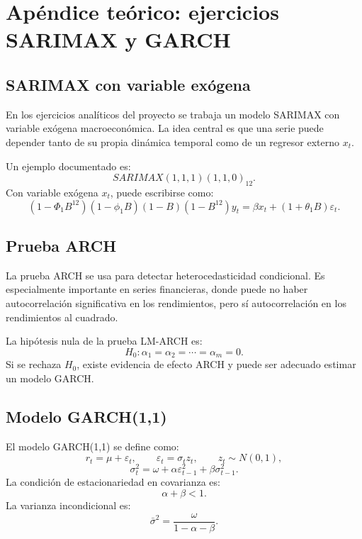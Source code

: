 \documentclass[11pt,letterpaper]{article}
\begin{document}
\section{Apéndice teórico: ejercicios SARIMAX y GARCH}

\subsection{SARIMAX con variable exógena}

\begin{markdowncell}
En los ejercicios analíticos del proyecto se trabaja un modelo SARIMAX con variable exógena macroeconómica. La idea central es que una serie puede depender tanto de su propia dinámica temporal como de un regresor externo \(x_t\).
\end{markdowncell}

\begin{latexcell}
Un ejemplo documentado es:
\[
SARIMAX(1,1,1)(1,1,0)_{12}.
\]
Con variable exógena \(x_t\), puede escribirse como:
\[
(1-\Phi_1B^{12})(1-\phi_1B)(1-B)(1-B^{12})y_t
= \beta x_t + (1+\theta_1B)\varepsilon_t.
\]
\end{latexcell}

\subsection{Prueba ARCH}

\begin{markdowncell}
La prueba ARCH se usa para detectar heterocedasticidad condicional. Es especialmente importante en series financieras, donde puede no haber autocorrelación significativa en los rendimientos, pero sí autocorrelación en los rendimientos al cuadrado.
\end{markdowncell}

\begin{latexcell}
La hipótesis nula de la prueba LM-ARCH es:
\[
H_0:\alpha_1=\alpha_2=\cdots=\alpha_m=0.
\]
Si se rechaza \(H_0\), existe evidencia de efecto ARCH y puede ser adecuado estimar un modelo GARCH.
\end{latexcell}

\subsection{Modelo GARCH(1,1)}

\begin{latexcell}
El modelo GARCH(1,1) se define como:
\[
r_t=\mu+\varepsilon_t,
\qquad
\varepsilon_t=\sigma_t z_t,
\qquad
z_t\sim N(0,1),
\]
\[
\sigma_t^2=\omega+\alpha\varepsilon_{t-1}^2+\beta\sigma_{t-1}^2.
\]
La condición de estacionariedad en covarianza es:
\[
\alpha+\beta<1.
\]
La varianza incondicional es:
\[
\bar\sigma^2=\frac{\omega}{1-\alpha-\beta}.
\]
\end{latexcell}
\end{document}
